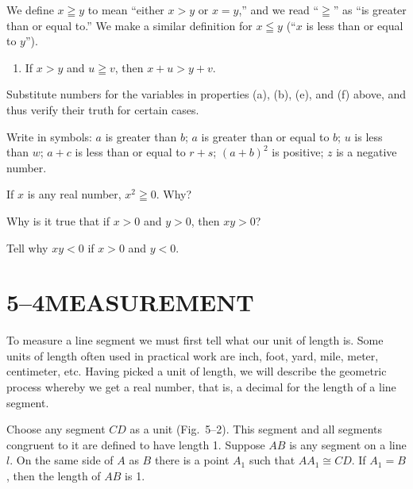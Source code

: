 \documentclass[11pt]{book}
\theoremstyle{bkplain}
\theoremstyle{XIplainnote}
\theoremstyle{bkplain}
\theoremstyle{bkplain}
\begin{document}
\medskip
We define $x \geqq y$ to mean ``either $x > y$ or $x = y$,'' and we read
``$\geqq$'' as ``is greater than or equal to.'' We make a similar definition
for $x \leqq y$ (``$x$ is less than or equal to $y$'').

\begin{enumerate}[label=(\alph*), leftmargin=2.2em, itemsep=1pt, topsep=3pt,
                  start=6]
\item If $x > y$ and $u \geqq v$, then $x + u > y + v$.
\end{enumerate}


\begin{exercisecols}
\begin{exlist}
\item Substitute numbers for the variables in properties (a), (b), (e), and (f)
      above, and thus verify their truth for certain cases.
\item Write in symbols: $a$ is greater than $b$; $a$ is greater than or equal
      to $b$; $u$ is less than $w$; $a + c$ is less than or equal to $r + s$;
      $(a + b)^2$ is positive; $z$ is a negative number.
\item If $x$ is any real number, $x^2 \geqq 0$. Why?
\item Why is it true that if $x > 0$ and $y > 0$, then $xy > 0$?
\item Tell why $xy < 0$ if $x > 0$ and $y < 0$.
\end{exlist}
\end{exercisecols}

\section*{5--4\quad MEASUREMENT}

To measure a line segment we must first tell what our unit of length is. Some
units of length often used in practical work are inch, foot, yard, mile, meter,
centimeter, etc. Having picked a unit of length, we will describe the geometric
process whereby we get a real number, that is, a decimal for the length of a
line segment.

Choose any segment $CD$ as a unit (Fig.~5--2). This segment and all segments
congruent to it are defined to have length 1. Suppose $AB$ is any segment on a
line $l$. On the same side of $A$ as $B$ there is a point $A_1$ such that
$AA_1 \cong CD$. If $A_1 = B$, then the length of $AB$ is 1.
\end{document}

